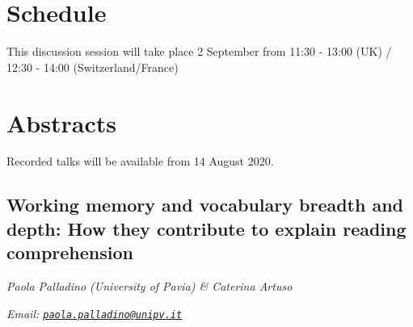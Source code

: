 \documentclass[
  12pt,
]{book}
\begin{document}
\hypertarget{schedule-2}{%
\section{Schedule}\label{schedule-2}}

This discussion session will take place 2 September from 11:30 - 13:00 (UK) / 12:30 - 14:00 (Switzerland/France)

\hypertarget{abstracts-2}{%
\section{Abstracts}\label{abstracts-2}}

Recorded talks will be available from 14 August 2020.

\hypertarget{working-memory-and-vocabulary-breadth-and-depth-how-they-contribute-to-explain-reading-comprehension}{%
\subsection{Working memory and vocabulary breadth and depth: How they contribute to explain reading comprehension}\label{working-memory-and-vocabulary-breadth-and-depth-how-they-contribute-to-explain-reading-comprehension}}

\emph{Paola Palladino (University of Pavia) \& Caterina Artuso}

\emph{Email: \href{mailto:paola.palladino@unipv.it}{\nolinkurl{paola.palladino@unipv.it}}}
\end{document}
